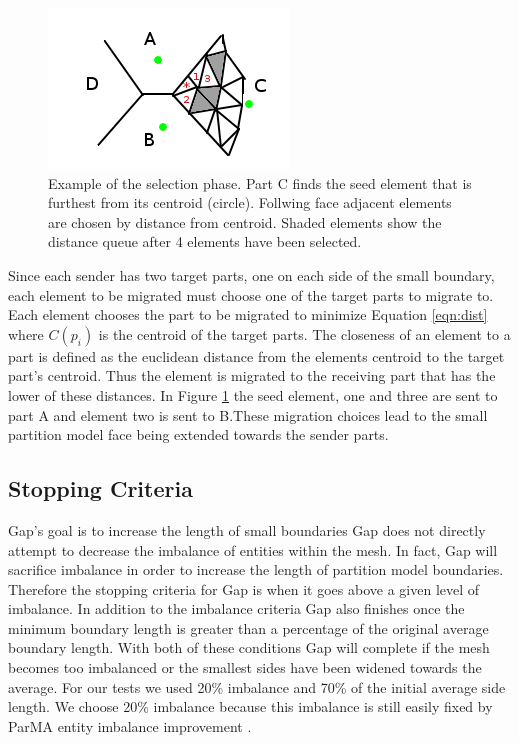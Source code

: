 \documentclass{thesis}
\begin{document}
\begin{figure} [!ht]
\centering
\captionsetup{justification=centering,margin=1cm}
\includegraphics[width=.6\textwidth]{selector_example.png}
\caption{\label{fig:selector} \textnormal{Example of the selection phase. Part C finds the seed element that is furthest from its centroid (circle). Follwing face adjacent elements are chosen by distance from centroid. Shaded elements show the distance queue after 4 elements have been selected. }}
\end{figure}

Since each sender has two target parts, one on each side of the small 
boundary, each element to be migrated must choose one of the target parts to 
migrate to. Each element chooses the part to be migrated to minimize Equation \ref{eqn:dist} where $C(p_i)$ is the centroid of the target parts. 
The closeness of an element to a part is defined as the euclidean distance 
from the elements centroid to the target part's centroid. Thus the element 
is migrated to the receiving part that has the lower of these distances. 
In Figure \ref{fig:selector} the seed element, one and three are sent to 
part A and element two is sent to B.These migration choices lead to the 
small partition model face being extended towards the sender parts. 


\subsection{Stopping Criteria}
Gap's goal is to increase the length of small boundaries
Gap does not directly attempt to decrease the imbalance of entities within 
the mesh. In fact, Gap will sacrifice imbalance in order to increase the 
length of partition model boundaries. Therefore the stopping criteria for Gap 
is when it goes above a given level of imbalance. In addition to the imbalance 
criteria Gap also finishes once the minimum boundary length is greater than 
a percentage of the original average boundary length. With both of these 
conditions Gap will complete if the mesh becomes too imbalanced or the 
smallest sides have been widened towards the average. For our tests we 
used 20\% imbalance and 70\% of the initial average side length. We choose 
20\% imbalance because this imbalance is still easily fixed by ParMA entity 
imbalance improvement \cite{parma,zhougraph,zhou2012}.
\end{document}
